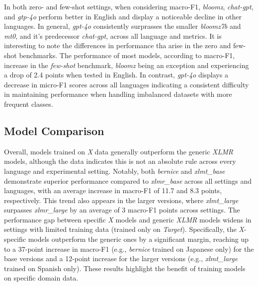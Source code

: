In both zero- and few-shot settings, %
when considering macro-F1, \textit{bloomz}, \textit{chat-gpt}, and \textit{gtp-4o} perform better in English and display a noticeable decline in other languages. 
In general, \textit{gpt-4o} consistently surprasses the smaller \textit{bloomz7b} and \textit{mt0}, and it's predecessor \textit{chat-gpt}, across all language and metrics.
It is interesting to note the differences in performance tha arise in the zero and few-shot benchmarks. The performance of most models, according to macro-F1, increase in the \textit{few-shot} benchmark, \textit{bloomz} being an exception and experiencing a drop of 2.4 points when tested in English. In contrast, \textit{gpt-4o} displays a decrease in micro-F1 scores across all languages indicating a consistent difficulty in maintaining performance when handling imbalanced datasets with more frequent classes.



\subsection{Model Comparison}


Overall, models trained on \textit{X} data generally outperform the generic \textit{XLMR} models, although the data indicates this is not an absolute rule across every language and experimental setting. Notably, both \textit{bernice} and \textit{xlmt\_base} demonstrate superior performance compared to \textit{xlmr\_base} across all settings and languages, with an average increase in macro-F1 of 11.7 and 8.3 points, respectively. This trend also appears in the larger versions, where \textit{xlmt\_large} surpasses \textit{xlmr\_large} by an average of 3 macro-F1 points across settings. The performance gap between specific \textit{X} models and generic \textit{XLMR} models widens in settings with limited training data (trained only on \textit{Target}). Specifically, the \textit{X}-specific models outperform the generic ones by a significant margin, reaching up to a 37-point increase in macro-F1 (e.g., \textit{bernice} trained on Japanese only) for the base versions and a 12-point increase for the larger versions (e.g., \textit{xlmt\_large} trained on Spanish only). These results highlight the benefit of training models on specific domain data.

